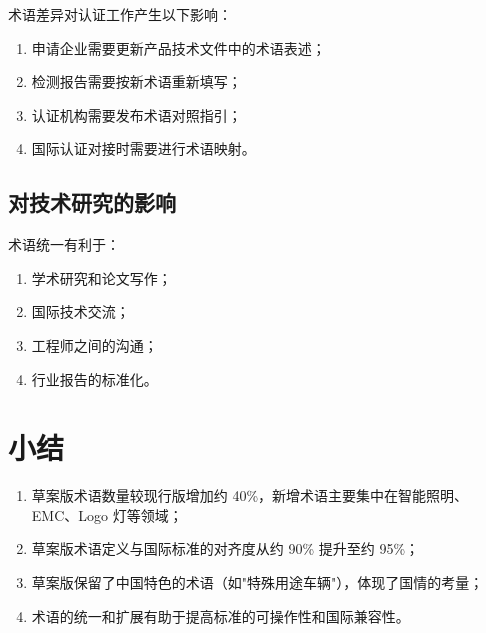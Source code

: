 术语差异对认证工作产生以下影响：

\begin{enumerate}[leftmargin=2em]
    \item 申请企业需要更新产品技术文件中的术语表述；
    \item 检测报告需要按新术语重新填写；
    \item 认证机构需要发布术语对照指引；
    \item 国际认证对接时需要进行术语映射。
\end{enumerate}

\subsection{对技术研究的影响}

术语统一有利于：

\begin{enumerate}[leftmargin=2em]
    \item 学术研究和论文写作；
    \item 国际技术交流；
    \item 工程师之间的沟通；
    \item 行业报告的标准化。
\end{enumerate}

\section{小结}

\begin{enumerate}[leftmargin=2em]
    \item 草案版术语数量较现行版增加约 40\%，新增术语主要集中在智能照明、EMC、Logo 灯等领域；
    \item 草案版术语定义与国际标准的对齐度从约 90\% 提升至约 95\%；
    \item 草案版保留了中国特色的术语（如"特殊用途车辆"），体现了国情的考量；
    \item 术语的统一和扩展有助于提高标准的可操作性和国际兼容性。
\end{enumerate}